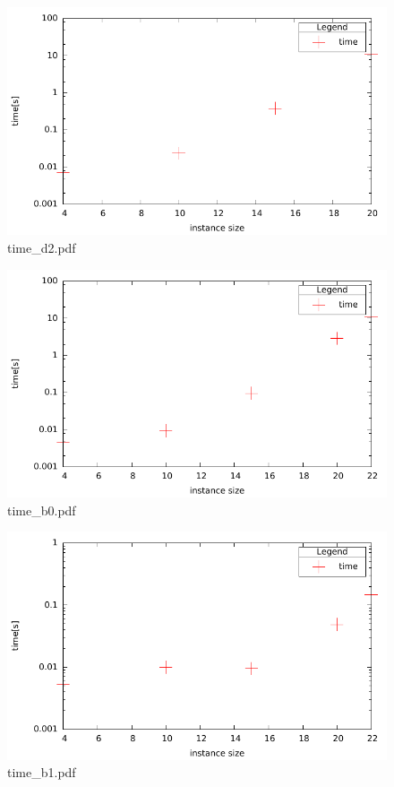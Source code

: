\documentclass[12pt,a4paper]{article}
\begin{document}
\begin{figure}[H]
\caption{time\_d2.pdf }
\includegraphics{./time_d2.pdf}
\end{figure}

\begin{figure}[H]
\caption{time\_b0.pdf }
\includegraphics{./time_b0.pdf}
\end{figure}

\begin{figure}[H]
\caption{time\_b1.pdf }
\includegraphics{./time_b1.pdf}
\end{figure}
\end{document}
